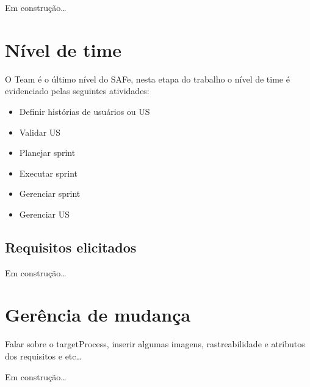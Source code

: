   Em construção\ldots

\section{Nível de time}

  O Team é o último nível do SAFe, nesta etapa do trabalho o nível de time é evidenciado pelas seguintes atividades:

  \begin{itemize}
    \item Definir histórias de usuários ou US
    \item Validar US
    \item Planejar sprint
    \item Executar sprint
    \item Gerenciar sprint
    \item Gerenciar US
  \end{itemize}

\subsection{Requisitos elicitados}

  Em construção\ldots

\section{Gerência de mudança}

  Falar sobre o targetProcess, inserir algumas imagens, rastreabilidade e atributos dos requisitos e etc\ldots

  Em construção\ldots

